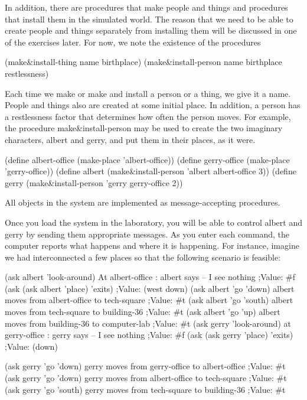 In addition, there are procedures that make people and things and
procedures that install them in the simulated world.  The reason that
we need to be able to create people and things separately from
installing them will be discussed in one of the exercises later.  For
now, we note the existence of the procedures

\beginlisp
  (make\&install-thing  name birthplace)
  (make\&install-person name birthplace restlessness)
\endlisp

Each time we make or make and install a person or a thing, we give it
a name.  People and things also are created at some initial place.  In
addition, a person has a restlessness factor that determines how often
the person moves. For example, the procedure {\cf
make\&install-person} may be used to create the two imaginary
characters, {\cf albert} and {\cf gerry}, and put them in their
places, as it were.

\beginlisp
  (define albert-office (make-place 'albert-office))
  (define gerry-office  (make-place 'gerry-office))
\null
  (define albert (make\&install-person 'albert albert-office 3))
  (define gerry  (make\&install-person 'gerry  gerry-office  2))
\endlisp

All objects in the system are implemented as message-accepting
procedures.

Once you load the system in the laboratory, you will be able to
control {\cf albert} and {\cf gerry} by sending them appropriate messages.
As you enter each command, the computer reports what happens and where
it is happening. For instance, imagine we had interconnected a few
places so that the following scenario is feasible:

\beginlisp
(ask albert 'look-around)
At albert-office : albert says -- I see nothing 
;Value: \#f
\null
(ask (ask albert 'place) 'exits)
;Value: (west down)
\null
(ask albert 'go 'down)
albert moves from albert-office to tech-square 
;Value: \#t
\null
(ask albert 'go 'south)
albert moves from tech-square to building-36 
;Value: \#t
\null
(ask albert 'go 'up)
albert moves from building-36 to computer-lab 
;Value: \#t
\null
(ask gerry 'look-around)
at gerry-office : gerry says -- I see nothing 
;Value: \#f
\null
(ask (ask gerry 'place) 'exits)
;Value: (down)
\endlisp

\beginlisp
(ask gerry 'go 'down)
gerry moves from gerry-office to albert-office
;Value: \#t
\null
(ask gerry 'go 'down)
gerry moves from albert-office to tech-square
;Value: \#t
\null
(ask gerry 'go 'south)
gerry moves from tech-square to building-36 
;Value: \#t
\endlisp

